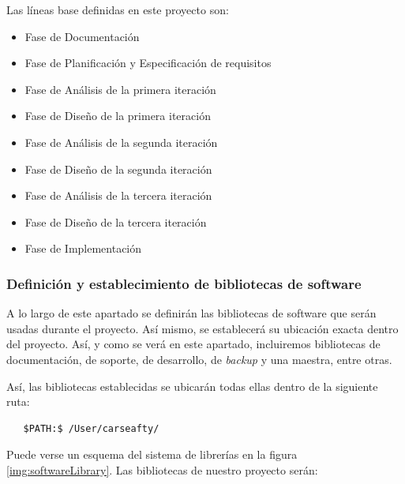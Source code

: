 \par Las líneas base definidas en este proyecto son:
\begin{itemize}[-]
  \item Fase de Documentación
  \item Fase de Planificación y Especificación de requisitos
  \item Fase de Análisis de la primera iteración
  \item Fase de Diseño de la primera iteración
  \item Fase de Análisis de la segunda iteración
  \item Fase de Diseño de la segunda iteración
  \item Fase de Análisis de la tercera iteración
  \item Fase de Diseño de la tercera iteración
  \item Fase de Implementación
\end{itemize}


\subsubsection{Definición y establecimiento de bibliotecas de software}
\par A lo largo de este apartado se definirán las bibliotecas de software que serán usadas durante el proyecto. Así mismo, se establecerá su ubicación exacta dentro del proyecto. Así, y como se verá en este apartado, incluiremos bibliotecas de documentación, de soporte, de desarrollo, de \textit{backup} y una maestra, entre otras.
\par Así, las bibliotecas establecidas se ubicarán todas ellas dentro de la siguiente ruta:
\begin{lstlisting}
   $PATH:$ /User/carseafty/
\end{lstlisting}

\par Puede verse un esquema del sistema de librerías en la figura \ref{img:softwareLibrary}. Las bibliotecas de nuestro proyecto serán:

